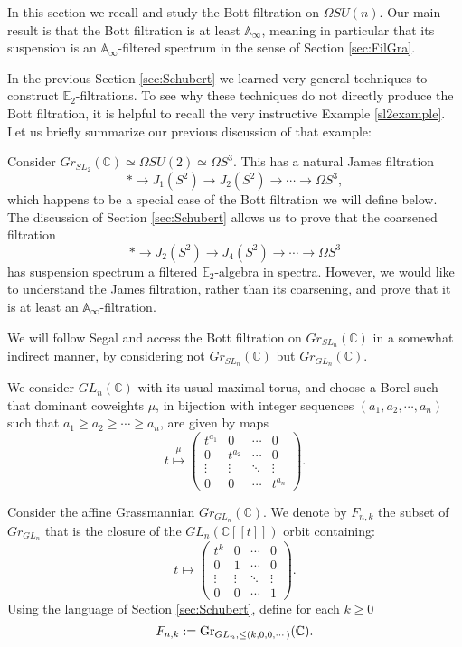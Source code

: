 In this section we recall and study the Bott filtration \cite{MitchellLoopGroup} on $\Omega SU(n)$.  Our main result is that the Bott filtration is at least $\mathbb{A}_\infty$, meaning in particular that its suspension is an $\mathbb{A}_\infty$-filtered spectrum in the sense of Section \ref{sec:FilGra}.

In the previous Section \ref{sec:Schubert} we learned very general techniques to construct $\mathbb{E}_2$-filtrations.  To see why these techniques do not directly produce the Bott filtration, it is helpful to recall the very instructive Example \ref{sl2example}.  Let us briefly summarize our previous discussion of that example:

\begin{rmk}
Consider $Gr_{SL_2}(\mathbb{C}) \simeq \Omega SU(2) \simeq \Omega S^3$.  This has a natural James filtration
$$* \longrightarrow J_1(S^2) \longrightarrow J_2(S^2) \longrightarrow \cdots \longrightarrow \Omega S^3,$$
which happens to be a special case of the Bott filtration we will define below.
The discussion of Section \ref{sec:Schubert} allows us to prove that the coarsened filtration
$$* \longrightarrow J_2(S^2) \longrightarrow J_4(S^2) \longrightarrow \cdots \longrightarrow \Omega S^3$$
has suspension spectrum a filtered $\mathbb{E}_2$-algebra in spectra.  However, we would like to understand the James filtration, rather than its coarsening, and prove that it is at least an $\mathbb{A}_\infty$-filtration.
\end{rmk}

We will follow Segal \cite{Segal} and access the Bott filtration on $Gr_{SL_n}(\mathbb{C})$ in a somewhat indirect manner, by considering not $Gr_{SL_n}(\mathbb{C})$ but $Gr_{GL_n}(\mathbb{C})$.

We consider $GL_n(\mathbb{C})$ with its usual maximal torus, and choose a Borel such that dominant coweights $\mu$, in bijection with integer sequences $(a_1,a_2,\cdots,a_n)$ such that $a_1 \ge a_2 \ge \cdots \ge a_n$, are given by maps
$$t \stackrel{\mu}{\mapsto} \left( \begin{array}{cccc} t^{a_1} & 0 & \cdots & 0 \\ 0 & t^{a_2} & \cdots & 0 \\ \vdots & \vdots & \ddots & \vdots \\ 0 & 0 & \cdots & t^{a_n} \end{array} \right).$$

\begin{dfn}
Consider the affine Grassmannian $Gr_{GL_n}(\mathbb{C})$.  We denote by $F_{n,k}$ the subset of $Gr_{GL_n}$ that is the closure of the $GL_n(\mathbb{C}[[t]])$ orbit containing:
$$t \mapsto \left( \begin{array}{cccc} t^k & 0 & \cdots & 0 \\ 0 & 1 & \cdots & 0 \\ \vdots & \vdots & \ddots & \vdots \\ 0 & 0 & \cdots & 1 \end{array} \right).$$
Using the language of Section \ref{sec:Schubert}, define for each $k\geq 0$
$$F_{n,k}  :=  \operatorname{\mathrm{Gr}}_{GL_n, \leq (k,0,0,\cdots)}(\mathbb{C}).$$
\end{dfn}

